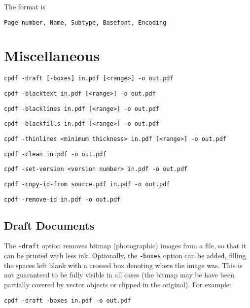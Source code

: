 \documentclass{book}
\begin{document}
  \noindent The format is
  \begin{framed}
  \small\noindent\verb!Page number, Name, Subtype, Basefont, Encoding!
  \vspace{2.5mm}
  \end{framed}

\label{listmisingfonts}

\chapter{Miscellaneous}
  {\small\begin{framed}
  \noindent\verb!cpdf -draft [-boxes] in.pdf [<range>] -o out.pdf!

  \vspace{1.5mm}
  \noindent\verb!cpdf -blacktext in.pdf [<range>] -o out.pdf!

  \vspace{1.5mm}
  \noindent\verb!cpdf -blacklines in.pdf [<range>] -o out.pdf!

  \vspace{1.5mm}
  \noindent\verb!cpdf -blackfills in.pdf [<range>] -o out.pdf!

  \vspace{1.5mm}
  \noindent\verb!cpdf -thinlines <minimum thickness> in.pdf [<range>] -o out.pdf!

  \vspace{1.5mm}
  \noindent\verb!cpdf -clean in.pdf -o out.pdf!

  \vspace{1.5mm}
  \noindent\verb!cpdf -set-version <version number> in.pdf -o out.pdf!

  \vspace{1.5mm}
  \noindent\verb!cpdf -copy-id-from source.pdf in.pdf -o out.pdf!

  \vspace{1.5mm}
  \noindent\verb!cpdf -remove-id in.pdf -o out.pdf!

  \end{framed}}
  \section{Draft Documents}
    The \texttt{-draft} option removes bitmap (photographic) images from a
file, so that it can be printed with less ink. Optionally, the
\texttt{-boxes} option can be added, filling the spaces left blank with a
crossed box denoting where the image was. This is not guaranteed to be fully
visible in all cases (the bitmap may be have been partially covered by vector
objects or clipped in the original). For example:
  \begin{framed}
    \small\verb!cpdf -draft -boxes in.pdf -o out.pdf!
  \end{framed}
\end{document}

